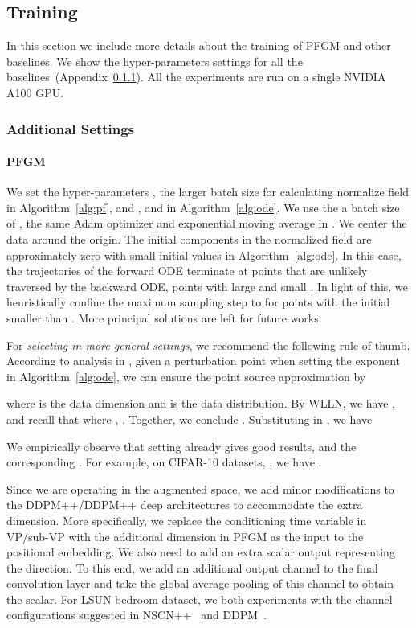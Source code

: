 \subsection{Training}
\label{app:training}

In this section we include more details about the training of PFGM and other baselines. We show the hyper-parameters settings for all the baselines~(Appendix~\ref{app:hyper-train}). All the experiments are run on a single NVIDIA A100 GPU.


\subsubsection{Additional Settings}
\label{app:hyper-train}

\paragraph{PFGM} We set the hyper-parameters , the larger batch size for calculating normalize field  in Algorithm~\ref{alg:pf}, and ,  and  in Algorithm~\ref{alg:ode}. We use the a batch size of , the same Adam optimizer and exponential moving average in \cite{Song2021ScoreBasedGM}. We center the data around the origin. The initial  components in the normalized field are approximately zero with small initial  values in Algorithm~\ref{alg:ode}. In this case, the trajectories of the forward ODE terminate at points that are unlikely traversed by the backward ODE, \ie points with large  and small . In light of this, we heuristically confine the maximum sampling step to  for points with the initial  smaller than . More principal solutions are left for future works.

For \textit{selecting  in more general settings}, we recommend the following rule-of-thumb. According to analysis in , given a perturbation point  when setting the exponent  in Algorithm~\ref{alg:ode}, we can ensure the point source approximation by

where  is the data dimension and  is the data distribution. By WLLN, we have , and recall that 
where , . Together, we conclude . Substituting in , we have 

We empirically observe that setting  already gives good results, and the corresponding . For example, on CIFAR-10 datasets, , we have . 

Since we are operating in the augmented space, we add minor modifications to the DDPM++/DDPM++ deep architectures to accommodate the extra dimension. More specifically, we replace the conditioning time variable in VP/sub-VP with the additional dimension  in PFGM as the input to the positional embedding. We also need to add an extra scalar output representing the  direction. To this end, we add an additional output channel to the final convolution layer and take the global average pooling of this channel to obtain the scalar. {For LSUN bedroom dataset, we both experiments with the channel configurations suggested in NSCN++~\cite{Song2021ScoreBasedGM} and DDPM~\cite{Ho2020DenoisingDP}.}

